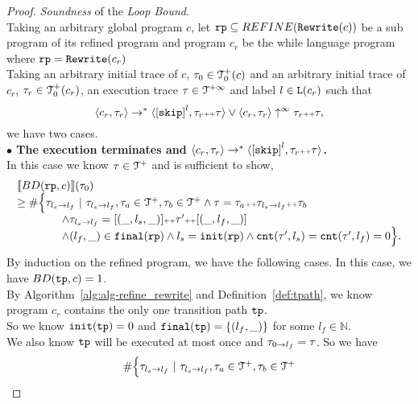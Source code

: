 \begin{proof}
\emph{Soundness} of the \emph{Loop Bound}.
  \\
  Taking an arbitrary global program $c$, let $\mathtt{rp} \subseteq REFINE(\mathtt{Rewrite}(c))$ be a sub program of its refined program and program $c_r$ be the while language program where $\mathtt{rp} = \mathtt{Rewrite}(c_r)$
  \\
Taking an arbitrary initial trace of $c$, $\mathtt{\tau}_0 \in \mathcal{T}^{+}_0(c)$ and an arbitrary initial trace of $c_r$, $\mathtt{\tau}_r \in \mathcal{T}^{+}_0(c_r)$, 
 an execution trace $\mathtt{\tau} \in \mathcal{T}^{+\infty}$ and label $l \in \mathtt{L}(c_r)$
 such that 
 \[
  \config{{c_r}, \trace_r} \to^{*} \config{\clabel{\eskip}^{l}, \trace_r \tracecat \trace} \lor \config{c_r, \trace_r} \uparrow^{\infty} \trace_r \tracecat \trace,
  \]
 we have two cases.
\\
\textbf{$\bullet$ The execution terminates and {$\config{{c_r}, \trace_r} \to^{*} \config{\clabel{\eskip}^{l}, \trace_r \tracecat \trace}$}.} 
\\
 In this case we know $\mathtt{\tau} \in \mathcal{T}^{+}$ and is sufficient to show,
 \[
  \begin{array}{l}
  \llbracket BD(\mathtt{rp}, c) \rrbracket(\mathtt{\tau}_0) 
  \\ \geq
  \# \Big\{\mathtt{\tau}_{l_s \to l_f} ~\vert~ \mathtt{\tau}_{l_s \to l_f}, \mathtt{\tau}_a \in \mathcal{T}^{+}, \mathtt{\tau}_b \in \mathcal{T}^{+}
  \land \mathtt{\tau} = \mathtt{\tau}_a {\scriptscriptstyle ++} \mathtt{\tau}_{l_s \to l_f} {\scriptscriptstyle ++} \mathtt{\tau}_b
  \\ \qquad \qquad
  \land \mathtt{\tau}_{l_s \to l_f} = [(\_, l_s, \_)] {\scriptscriptstyle ++} \mathtt{\tau}' {\scriptscriptstyle ++} [(\_, l_f, \_)]
  \\ \qquad \qquad
  \land (l_{f}, \_) \in \mathtt{final}(\mathtt{rp})
  \land l_s = \mathtt{init}(\mathtt{rp})
  \land \mathtt{cnt}(\mathtt{\tau}', l_s) = \mathtt{cnt}(\mathtt{\tau}', l_f) = 0 
  \Big\}.
\end{array}
\]
By induction on the refined program, we have the following cases.
\caseL{$\rprog = \tpath$}
In this case, we have $BD(\mathtt{tp}, c) = 1$.
\\
By Algorithm~\ref{alg:alg-refine_rewrite} and Definition~\ref{def:tpath}, we know program $c_r$ contains the only one transition path $\mathtt{tp}$.
\\
So we know $\mathtt{init}(\mathtt{tp}) = 0$ and $\mathtt{final}(\mathtt{tp}) = \{ (l_f, \_) \}$ for some $l_f \in \mathbb{N}$.
\\
We also know $\mathtt{tp}$ will be executed at most once and $\mathtt{\tau}_{0 \to l_f} = \mathtt{\tau}$. So we have
\[
  \begin{array}{l}
    \# \Big\{\mathtt{\tau}_{l_s \to l_f} ~\vert~ \mathtt{\tau}_{l_s \to l_f}, \mathtt{\tau}_a \in \mathcal{T}^{+}, \mathtt{\tau}_b \in \mathcal{T}^{+}

\end{array}\]
\end{proof}
